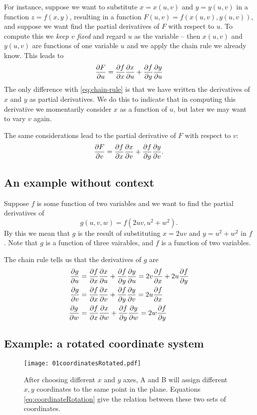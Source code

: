 For instance, suppose we want to substitute $x=x(u,v)$ and $y=y(u,v)$ in a
function $z=f(x, y)$, resulting in a function $F(u,v) = f(x(u,v), y(u,v))$, and
suppose we want find the partial derivatives of $F$ with respect to $u$.  To
compute this we \textit{keep $v$ fixed} and regard $u$ as the variable -- then
$x(u, v)$ and $y(u, v)$ are functions of one variable $u$ and we apply the chain
rule we already know.  This leads to
\[
\frac{\partial F}{\partial u} = \frac{\partial f}{\partial x} \frac{\partial x}{\partial u} + \frac{\partial f}{\partial y} \frac{\partial y}{\partial u}
\]
The only difference with \eqref{eq:chain-rule} is that we have written the
derivatives of $x$ and $y$ as partial derivatives.  We do this to indicate that
in computing this derivative we momentarily consider $x$ as a function of $u$,
but later we may want to vary $v$ again.

The same considerations lead to the partial derivative of $F$ with respect to
$v$:
\[
\frac{\partial F}{\partial v} = \frac{\partial f}{\partial x} \frac{\partial x}{\partial v} + \frac{\partial f}{\partial y} \frac{\partial y}{\partial v}.
\]
\subsection{An example without context}
Suppose $f$ is some function of two variables and we want to find the partial
derivatives of
\[
g(u, v, w) = f(2uv, u^2+w^2).
\]
By this we mean that $g$ is the result of substituting $x= 2uv$ and $y=u^2+w^2$
in $f$.  Note that $g$ is a function of three vairables, and $f$ is a function
of two variables.

The chain rule tells us that the derivatives of $g$ are
\begin{align*}
  \frac{\partial g}{\partial u} &= \frac{\partial f}{\partial x}\frac{\partial x}{\partial u} +\frac{\partial f}{\partial y} \frac{\partial y}{\partial u} = 2v\frac{\partial f}{\partial x} + 2u\frac{\partial f}{\partial y}\\
  \frac{\partial g}{\partial v} &= \frac{\partial f}{\partial x}\frac{\partial x}{\partial v} +\frac{\partial f}{\partial y} \frac{\partial y}{\partial v} = 2u\frac{\partial f}{\partial x} \\
  \frac{\partial g}{\partial w} &= \frac{\partial f}{\partial x}\frac{\partial x}{\partial w} +\frac{\partial f}{\partial y} \frac{\partial y}{\partial w} = 2w\frac{\partial f}{\partial y}
\end{align*}


\subsection{Example: a rotated coordinate system}
\label{sec:01rotated-coordinates}

\begin{figure}[b]
  \centering
  \texttt{[image: 01coordinatesRotated.pdf]}
  \caption{After choosing different $x$ and $y$ axes, A and B will assign
    different $x, y$ coordinates to the same point in the plane.  Equations
    \eqref{eq:coordinateRotation} give the relation between these two sets of
    coordinates. }
  \label{fig:coordinateRotation}
\end{figure}

